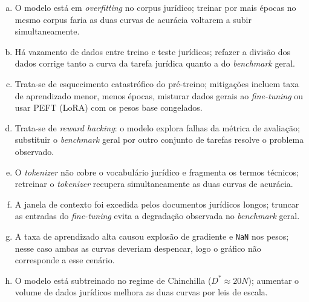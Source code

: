 \documentclass{dlproblemset}
\begin{document}
\begin{enumerate}[I)]
\begin{center}
\end{center}

\begin{enumerate}[a)]
    \item O modelo está em \textit{overfitting} no corpus jurídico; treinar por mais épocas no mesmo corpus faria as duas curvas de acurácia voltarem a subir simultaneamente.
    \item Há vazamento de dados entre treino e teste jurídicos; refazer a divisão dos dados corrige tanto a curva da tarefa jurídica quanto a do \textit{benchmark} geral.
    \item Trata-se de esquecimento catastrófico do pré-treino; mitigações incluem taxa de aprendizado menor, menos épocas, misturar dados gerais ao \textit{fine-tuning} ou usar PEFT (LoRA) com os pesos base congelados.
    \item Trata-se de \textit{reward hacking}: o modelo explora falhas da métrica de avaliação; substituir o \textit{benchmark} geral por outro conjunto de tarefas resolve o problema observado.
    \item O \textit{tokenizer} não cobre o vocabulário jurídico e fragmenta os termos técnicos; retreinar o \textit{tokenizer} recupera simultaneamente as duas curvas de acurácia.
    \item A janela de contexto foi excedida pelos documentos jurídicos longos; truncar as entradas do \textit{fine-tuning} evita a degradação observada no \textit{benchmark} geral.
    \item A taxa de aprendizado alta causou explosão de gradiente e \texttt{NaN} nos pesos; nesse caso ambas as curvas deveriam despencar, logo o gráfico não corresponde a esse cenário.
    \item O modelo está subtreinado no regime de Chinchilla ($D^{*} \approx 20N$); aumentar o volume de dados jurídicos melhora as duas curvas por leis de escala.
\end{enumerate}


\end{enumerate}
\end{document}
